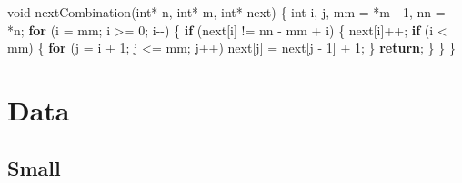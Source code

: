 \documentclass[
  12pt,
  letterpaper,
  DIV=11,
  numbers=noendperiod]{scrreprt}
\newenvironment{Shaded}{\begin{snugshade}}{\end{snugshade}}
\newcommand{\ControlFlowTok}[1]{\textcolor[rgb]{0.00,0.23,0.31}{\textbf{#1}}}
\newcommand{\DataTypeTok}[1]{\textcolor[rgb]{0.68,0.00,0.00}{#1}}
\newcommand{\DecValTok}[1]{\textcolor[rgb]{0.68,0.00,0.00}{#1}}
\newcommand{\NormalTok}[1]{\textcolor[rgb]{0.00,0.23,0.31}{#1}}
\newcommand{\OperatorTok}[1]{\textcolor[rgb]{0.37,0.37,0.37}{#1}}
\theoremstyle{remark}
\begin{document}
\begin{Shaded}
\begin{Highlighting}[]
\DataTypeTok{void}\NormalTok{ nextCombination}\OperatorTok{(}\DataTypeTok{int}\OperatorTok{*}\NormalTok{ n}\OperatorTok{,} \DataTypeTok{int}\OperatorTok{*}\NormalTok{ m}\OperatorTok{,} \DataTypeTok{int}\OperatorTok{*}\NormalTok{ next}\OperatorTok{)} \OperatorTok{\{}
    \DataTypeTok{int}\NormalTok{ i}\OperatorTok{,}\NormalTok{ j}\OperatorTok{,}\NormalTok{ mm }\OperatorTok{=} \OperatorTok{*}\NormalTok{m }\OperatorTok{{-}} \DecValTok{1}\OperatorTok{,}\NormalTok{ nn }\OperatorTok{=} \OperatorTok{*}\NormalTok{n}\OperatorTok{;}
    \ControlFlowTok{for} \OperatorTok{(}\NormalTok{i }\OperatorTok{=}\NormalTok{ mm}\OperatorTok{;}\NormalTok{ i }\OperatorTok{\textgreater{}=} \DecValTok{0}\OperatorTok{;}\NormalTok{ i}\OperatorTok{{-}{-})} \OperatorTok{\{}
        \ControlFlowTok{if} \OperatorTok{(}\NormalTok{next}\OperatorTok{[}\NormalTok{i}\OperatorTok{]} \OperatorTok{!=}\NormalTok{ nn }\OperatorTok{{-}}\NormalTok{ mm }\OperatorTok{+}\NormalTok{ i}\OperatorTok{)} \OperatorTok{\{}
\NormalTok{            next}\OperatorTok{[}\NormalTok{i}\OperatorTok{]++;}
            \ControlFlowTok{if} \OperatorTok{(}\NormalTok{i }\OperatorTok{\textless{}}\NormalTok{ mm}\OperatorTok{)} \OperatorTok{\{}
                \ControlFlowTok{for} \OperatorTok{(}\NormalTok{j }\OperatorTok{=}\NormalTok{ i }\OperatorTok{+} \DecValTok{1}\OperatorTok{;}\NormalTok{ j }\OperatorTok{\textless{}=}\NormalTok{ mm}\OperatorTok{;}\NormalTok{ j}\OperatorTok{++)}\NormalTok{ next}\OperatorTok{[}\NormalTok{j}\OperatorTok{]} \OperatorTok{=}\NormalTok{ next}\OperatorTok{[}\NormalTok{j }\OperatorTok{{-}} \DecValTok{1}\OperatorTok{]} \OperatorTok{+} \DecValTok{1}\OperatorTok{;}
            \OperatorTok{\}}
            \ControlFlowTok{return}\OperatorTok{;}
        \OperatorTok{\}}
    \OperatorTok{\}}
\OperatorTok{\}}
\end{Highlighting}
\end{Shaded}


\chapter*{Data}\label{apdatasets}


\section*{Small}\label{apdatadsmall}
\end{document}
